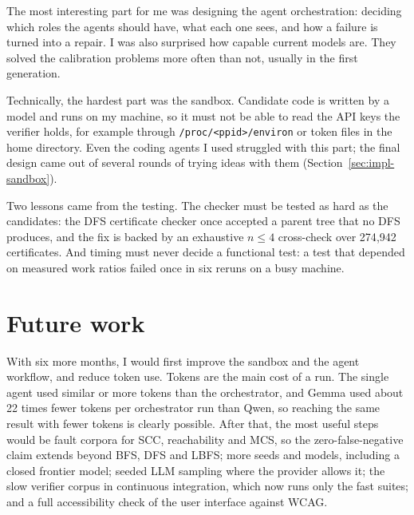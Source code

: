 The most interesting part for me was designing the agent orchestration:
deciding which roles the agents should have, what each one sees, and how a
failure is turned into a repair. I was also surprised how capable current models
are. They solved the calibration problems more often than not, usually in the
first generation.

Technically, the hardest part was the sandbox. Candidate code is written by a
model and runs on my machine, so it must not be able to read the API keys the
verifier holds, for example through \texttt{/proc/<ppid>/environ} or token files
in the home directory. Even the coding agents I used struggled with this part;
the final design came out of several rounds of trying ideas with them
(Section~\ref{sec:impl-sandbox}).

Two lessons came from the testing. The checker must be tested as hard as the
candidates: the DFS certificate checker once accepted a parent tree that no DFS
produces, and the fix is backed by an exhaustive $n \le 4$ cross-check over
274{,}942 certificates. And timing must never decide a functional test: a test
that depended on measured work ratios failed once in six reruns on a busy
machine.

\section{Future work}

With six more months, I would first improve the sandbox and the agent workflow,
and reduce token use. Tokens are the main cost of a run. The single agent used
similar or more tokens than the orchestrator, and Gemma used about 22 times
fewer tokens per orchestrator run than Qwen, so reaching the same result with
fewer tokens is clearly possible. After that, the most useful steps would be
fault corpora for SCC, reachability and MCS, so the zero-false-negative claim
extends beyond BFS, DFS and LBFS; more seeds and models, including a closed
frontier model; seeded LLM sampling where the provider allows it; the slow verifier corpus
in continuous integration, which now runs only the fast suites; and a full
accessibility check of the user interface against WCAG.
